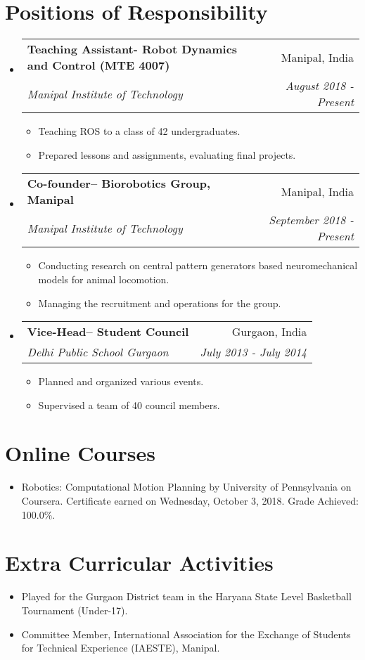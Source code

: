 \documentclass[letterpaper,11pt]{article}
\makeatletter
\newcommand{\rItemDesc}[2]{
  \item\small{
    \textbf{#1}{ #2 \vspace{-2pt}}
  }
}
\newcommand{\rItemDescp}[2]{
  \item\small{
    \textbf{#1}{ #2 \vspace{-6pt}}
  }
}
\newcommand{\rSubheading}[4]{
  \vspace{-1pt}\item
    \begin{tabular*}{0.97\textwidth}[t]{l@{\extracolsep{\fill}}r}
      \textbf{#1} & #2 \\
      \textit{\small#3} & \textit{\small #4} \\
    \end{tabular*}\vspace{-5pt}
}
\newcommand{\rSubHeadingListStart}{\begin{itemize}[leftmargin=*]}
\newcommand{\rSubHeadingListEnd}{\end{itemize}}
\newcommand{\rItemListStart}{\begin{itemize}}
\newcommand{\rItemListEnd}{\end{itemize}\vspace{-5pt}}
\makeatother
\begin{document}
\section{Positions of Responsibility}
  \rSubHeadingListStart
    \rSubheading
      {Teaching Assistant- Robot Dynamics and Control (MTE 4007)}{Manipal, India}
      {Manipal Institute of Technology}{August 2018 - Present}
      \rItemListStart
        \rItemDesc{}
          {Teaching ROS to a class of 42 undergraduates.}
        \rItemDesc{}
          {Prepared lessons and assignments, evaluating final projects.}
      \rItemListEnd
    \rSubheading
      {Co-founder-- Biorobotics Group, Manipal}{Manipal, India}
      {Manipal Institute of Technology}{September 2018 - Present}
      \rItemListStart
        \rItemDesc{}
          {Conducting research on central pattern generators based neuromechanical models for animal locomotion.}
        \rItemDesc{}
            {Managing the recruitment and operations for the group.}
      \rItemListEnd
    \rSubheading
      {Vice-Head-- Student Council}{Gurgaon, India}
      {Delhi Public School Gurgaon}{July 2013 - July 2014}
      \rItemListStart
        \rItemDesc{}
          {Planned and organized various events.}
        \rItemDesc{}
          {Supervised a team of 40 council members.}
      \rItemListEnd
  \rSubHeadingListEnd
\section{Online Courses}
  \rSubHeadingListStart
    \rItemDescp{}
      {Robotics: Computational Motion Planning by University of Pennsylvania on Coursera. Certificate earned on Wednesday, October 3, 2018. Grade Achieved: 100.0\%.}
  \rSubHeadingListEnd
\section{Extra Curricular Activities}
  \rSubHeadingListStart
    \rItemDescp{}
      {Played for the Gurgaon District team in the Haryana State Level Basketball Tournament (Under-17).}
    \rItemDescp{}
      {Committee Member, International Association for the Exchange of Students for Technical Experience (IAESTE), Manipal.}
  \rSubHeadingListEnd
\end{document}
